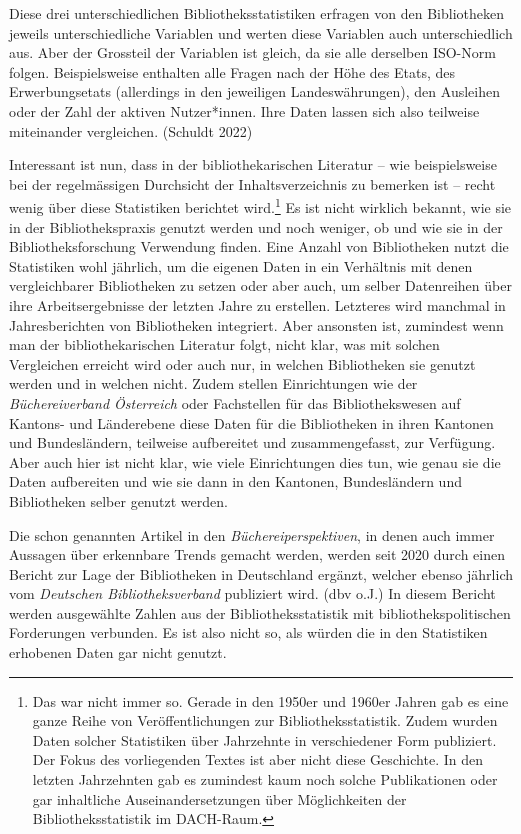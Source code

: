 \documentclass[a4paper,
fontsize=11pt,
oneside,
numbers=noperiodatend,
parskip=half-,
bibliography=totoc,
final
]{scrartcl}
\begin{document}
Diese drei unterschiedlichen Bibliotheksstatistiken erfragen von den
Bibliotheken jeweils unterschiedliche Variablen und werten diese
Variablen auch unterschiedlich aus. Aber der Grossteil der Variablen ist
gleich, da sie alle derselben ISO-Norm folgen. Beispielsweise enthalten
alle Fragen nach der Höhe des Etats, des Erwerbungsetats (allerdings in
den jeweiligen Landeswährungen), den Ausleihen oder der Zahl der aktiven
Nutzer*innen. Ihre Daten lassen sich also teilweise miteinander
vergleichen. (Schuldt 2022)

Interessant ist nun, dass in der bibliothekarischen Literatur -- wie
beispielsweise bei der regelmässigen Durchsicht der Inhaltsverzeichnis
zu bemerken ist -- recht wenig über diese Statistiken berichtet
wird.\footnote{Das war nicht immer so. Gerade in den 1950er und 1960er
  Jahren gab es eine ganze Reihe von Veröffentlichungen zur
  Bibliotheksstatistik. Zudem wurden Daten solcher Statistiken über
  Jahrzehnte in verschiedener Form publiziert. Der Fokus des
  vorliegenden Textes ist aber nicht diese Geschichte. In den letzten
  Jahrzehnten gab es zumindest kaum noch solche Publikationen oder gar
  inhaltliche Auseinandersetzungen über Möglichkeiten der
  Bibliotheksstatistik im DACH-Raum.} Es ist nicht wirklich bekannt, wie
sie in der Bibliothekspraxis genutzt werden und noch weniger, ob und wie
sie in der Bibliotheksforschung Verwendung finden. Eine Anzahl von
Bibliotheken nutzt die Statistiken wohl jährlich, um die eigenen Daten
in ein Verhältnis mit denen vergleichbarer Bibliotheken zu setzen oder
aber auch, um selber Datenreihen über ihre Arbeitsergebnisse der letzten
Jahre zu erstellen. Letzteres wird manchmal in Jahresberichten von
Bibliotheken integriert. Aber ansonsten ist, zumindest wenn man der
bibliothekarischen Literatur folgt, nicht klar, was mit solchen
Vergleichen erreicht wird oder auch nur, in welchen Bibliotheken sie
genutzt werden und in welchen nicht. Zudem stellen Einrichtungen wie der
\emph{Büchereiverband Österreich} oder Fachstellen für das
Bibliothekswesen auf Kantons- und Länderebene diese Daten für die
Bibliotheken in ihren Kantonen und Bundesländern, teilweise aufbereitet
und zusammengefasst, zur Verfügung. Aber auch hier ist nicht klar, wie
viele Einrichtungen dies tun, wie genau sie die Daten aufbereiten und
wie sie dann in den Kantonen, Bundesländern und Bibliotheken selber
genutzt werden.

Die schon genannten Artikel in den \emph{Büchereiperspektiven}, in denen
auch immer Aussagen über erkennbare Trends gemacht werden, werden seit
2020 durch einen Bericht zur Lage der Bibliotheken in Deutschland
ergänzt, welcher ebenso jährlich vom \emph{Deutschen Bibliotheksverband}
publiziert wird. (dbv o.J.) In diesem Bericht werden ausgewählte Zahlen
aus der Bibliotheksstatistik mit bibliothekspolitischen Forderungen
verbunden. Es ist also nicht so, als würden die in den Statistiken
erhobenen Daten gar nicht genutzt.
\end{document}
